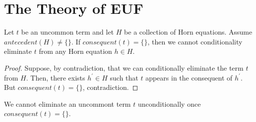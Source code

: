 \chapter{The Theory of EUF}

\begin{theorem}
  Let $t$ be an uncommon term and let $H$ be a collection of Horn equations.
  Assume $antecedent(H) \neq \{\}$. If $consequent(t) = \{\}$, then we cannot
  conditionality eliminate $t$ from any Horn equation $h \in H$. 
\end{theorem}

\begin{proof}
  Suppose, by contradiction, that we can conditionally eliminate the term
  $t$ from $H$. Then, there exists $h^{'} \in H$ such that $t$ appears in the
  consequent of $h^{'}$. But $consequent(t) = \{\}$, contradiction.
\end{proof}

\begin{corollary}
  We cannot eliminate an uncommont term $t$ unconditionally once
  $consequent(t) = \{\}$.
\end{corollary}

